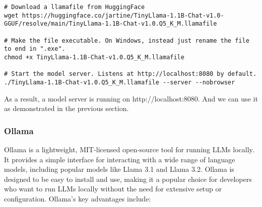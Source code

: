 \begin{verbatim}
# Download a llamafile from HuggingFace
wget https://huggingface.co/jartine/TinyLlama-1.1B-Chat-v1.0-GGUF/resolve/main/TinyLlama-1.1B-Chat-v1.0.Q5_K_M.llamafile

# Make the file executable. On Windows, instead just rename the file to end in ".exe".
chmod +x TinyLlama-1.1B-Chat-v1.0.Q5_K_M.llamafile

# Start the model server. Listens at http://localhost:8080 by default.
./TinyLlama-1.1B-Chat-v1.0.Q5_K_M.llamafile --server --nobrowser
\end{verbatim}

As a result, a model server is running on http://localhost:8080. And we can use it as demonstrated in the previous section.

\subsubsection{Ollama}

Ollama is a lightweight, MIT-licensed open-source tool for running LLMs locally. It provides a simple interface for interacting with a wide range of language models, including popular models like Llama 3.1 and Llama 3.2. Ollama is designed to be easy to install and use, making it a popular choice for developers who want to run LLMs locally without the need for extensive setup or configuration. Ollama's key advantages include:

